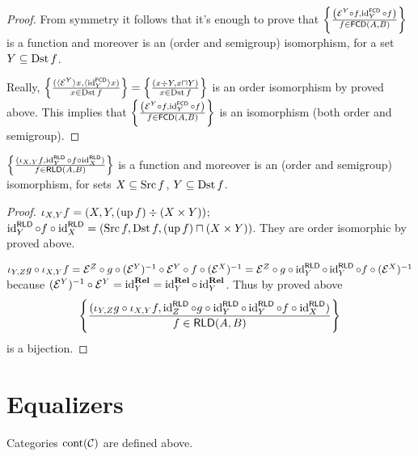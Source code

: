 \begin{proof}
  From symmetry it follows that it's enough to prove that $\left\{ \frac{ \left(
  \mathcal{E}^Y \circ f , \operatorname{id}^{\mathsf{FCD}}_Y \circ f \right)
  }{ f \in \mathsf{FCD} (A , B) }\right\}$ is a
  function and moreover is an (order and semigroup) isomorphism, for a set $Y
  \subseteq \operatorname{Dst} f$.
  
  Really, $\left\{ \frac{ (\langle \mathcal{E}^Y \rangle x , \langle
  \operatorname{id}^{\mathsf{FCD}}_Y \rangle x) }{ x
  \in \operatorname{Dst} f }\right\} = \left\{ \frac{ (x \div Y , x \sqcap Y) }{
  x \in \operatorname{Dst} f }\right\}$ is an order isomorphism by proved
  above. This implies that $\left\{ \frac{ \left( \mathcal{E}^Y \circ f ,
  \operatorname{id}^{\mathsf{FCD}}_Y \circ f \right) }{
  f \in \mathsf{FCD} (A , B) }\right\}$ is an isomorphism
  (both order and semigroup).
\end{proof}

\begin{prop}
  $\left\{ \frac{ (\iota_{X, Y} f , \operatorname{id}^{\mathsf{RLD}}_Y \circ f \circ
  \operatorname{id}^{\mathsf{RLD}}_X) }{ f \in
  \mathsf{RLD} (A , B) }\right\}$ is a function and moreover is an
  (order and semigroup) isomorphism, for sets $X \subseteq \operatorname{Src} f$, $Y
  \subseteq \operatorname{Dst} f$.
\end{prop}

\begin{proof}
  $\iota_{X, Y} f = (X , Y , (\operatorname{up} f) \div (X \times Y))$;
  $\operatorname{id}^{\mathsf{RLD}}_Y \circ f \circ
  \operatorname{id}^{\mathsf{RLD}}_X = (\operatorname{Src} f , \operatorname{Dst} f ,
  (\operatorname{up} f) \sqcap (X \times Y))$. They are order isomorphic by proved
  above.
  
  $\iota_{Y, Z} g \circ \iota_{X, Y} f =\mathcal{E}^Z \circ g \circ
  (\mathcal{E}^Y)^{- 1} \circ \mathcal{E}^Y \circ f \circ (\mathcal{E}^X)^{-
  1} =\mathcal{E}^Z \circ g \circ \operatorname{id}^{\mathsf{RLD}}_Y \circ
  \operatorname{id}^{\mathsf{RLD}}_Y \circ f \circ (\mathcal{E}^X)^{- 1}$
  because $(\mathcal{E}^Y)^{- 1} \circ \mathcal{E}^Y =
  \operatorname{id}^{\mathbf{Rel}}_Y = \operatorname{id}^{\mathbf{Rel}}_Y
  \circ \operatorname{id}^{\mathbf{Rel}}_Y$. Thus by proved above
  \[ \left\{ \frac{ (\iota_{Y, Z} g \circ \iota_{X, Y} f ,
     \operatorname{id}^{\mathsf{RLD}}_Z \circ g \circ
     \operatorname{id}^{\mathsf{RLD}}_Y \circ \operatorname{id}^{\mathsf{RLD}}_Y
     \circ f \circ \operatorname{id}^{\mathsf{RLD}}_X) }{
     f \in \mathsf{RLD} (A , B) }\right\} \]
  is a bijection.
\end{proof}

\section{Equalizers}

Categories $\operatorname{cont} (\mathcal{C})$ are defined above.

